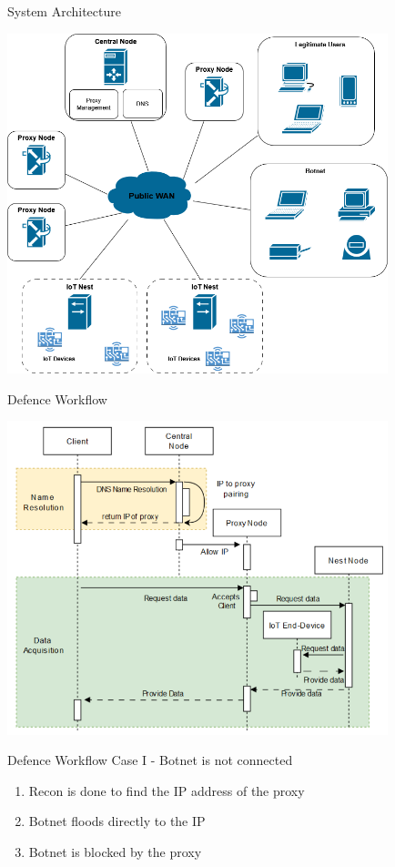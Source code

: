 \documentclass{beamer}
\begin{document}
\begin{frame}{System Architecture}
  \begin{center}
    \includegraphics[width=0.83\textwidth]{presentation/images/system_architecture.png}
  \end{center}
  
\end{frame}

\begin{frame}{Defence Workflow}
  \begin{center}
    \includegraphics[width=0.83\textwidth]{presentation/images/sequence_diagram.png}
  \end{center}
\end{frame}

\begin{frame}{Defence Workflow}
Case I - Botnet is not connected
    \begin{enumerate}
        \item Recon is done to find the IP address of the proxy
        \item Botnet floods directly to the IP
        \item Botnet is blocked by the proxy
    \end{enumerate}

\end{frame}
\end{document}
